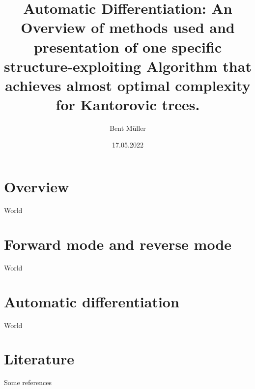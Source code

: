 \documentclass[compress]{beamer}
\title{
	Automatic Differentiation:
	An Overview of methods used and presentation of one
	specific structure-exploiting Algorithm that achieves
	almost optimal complexity for Kantorovic trees.
}
\author{Bent Müller}
\institute{Universität Hamburg}
\date{17.05.2022}
\begin{document}
\begin{frame}
	\titlepage
\end{frame}

\section{Overview}
\begin{frame}
	\tableofcontents
\end{frame}

\begin{frame}
	World
\end{frame}

\section{Forward mode and reverse mode}
\begin{frame}
	World
\end{frame}

\section{Automatic differentiation}
\begin{frame}
	World
\end{frame}

\section{Literature}
\begin{frame}
	Some references
\end{frame}
\end{document}
